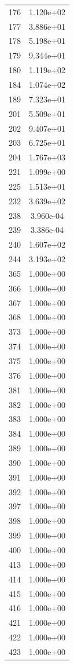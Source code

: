 \documentclass[12pt]{article}
\begin{document}
\begin{longtable}{@{}cc@{}}
176 & 1.120e+02 \\
177 & 3.886e+01 \\
178 & 5.198e+01 \\
179 & 9.344e+01 \\
180 & 1.119e+02 \\
184 & 1.074e+02 \\
189 & 7.323e+01 \\
201 & 5.509e+01 \\
202 & 9.407e+01 \\
203 & 6.725e+01 \\
204 & 1.767e+03 \\
221 & 1.099e+00 \\
225 & 1.513e+01 \\
232 & 3.639e+02 \\
238 & 3.960e-04 \\
239 & 3.386e-04 \\
240 & 1.607e+02 \\
244 & 3.193e+02 \\
365 & 1.000e+00 \\
366 & 1.000e+00 \\
367 & 1.000e+00 \\
368 & 1.000e+00 \\
373 & 1.000e+00 \\
374 & 1.000e+00 \\
375 & 1.000e+00 \\
376 & 1.000e+00 \\
381 & 1.000e+00 \\
382 & 1.000e+00 \\
383 & 1.000e+00 \\
384 & 1.000e+00 \\
389 & 1.000e+00 \\
390 & 1.000e+00 \\
391 & 1.000e+00 \\
392 & 1.000e+00 \\
397 & 1.000e+00 \\
398 & 1.000e+00 \\
399 & 1.000e+00 \\
400 & 1.000e+00 \\
413 & 1.000e+00 \\
414 & 1.000e+00 \\
415 & 1.000e+00 \\
416 & 1.000e+00 \\
421 & 1.000e+00 \\
422 & 1.000e+00 \\
423 & 1.000e+00 \\

\end{longtable}
\end{document}

